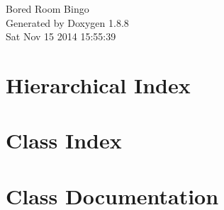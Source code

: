 \documentclass[twoside]{book}
\newcommand{\+}{\discretionary{\mbox{\scriptsize$\hookleftarrow$}}{}{}}
\newcommand{\clearemptydoublepage}{%
  \newpage{\pagestyle{empty}\cleardoublepage}%
}
\begin{document}
\hypersetup{pageanchor=false,
             bookmarks=true,
             bookmarksnumbered=true,
             pdfencoding=unicode
            }
\begin{titlepage}
\vspace*{7cm}
\begin{center}%
{\Large Bored Room Bingo }\\
\vspace*{1cm}
{\large Generated by Doxygen 1.8.8}\\
\vspace*{0.5cm}
{\small Sat Nov 15 2014 15:55:39}\\
\end{center}
\end{titlepage}
\clearemptydoublepage
\tableofcontents
\clearemptydoublepage
{}
\hypersetup{pageanchor=true}

\chapter{Hierarchical Index}

\chapter{Class Index}

\chapter{Class Documentation}



























\newpage
{}
{}
\printindex
\end{document}
